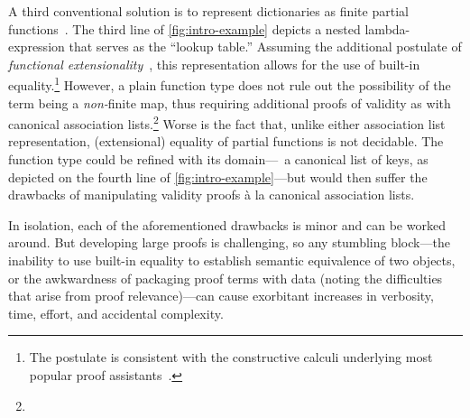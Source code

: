 A third conventional solution is to represent dictionaries as finite partial functions~\citep{XXX,XXX,XXX}.
%
The third line of \autoref{fig:intro-example} depicts a nested lambda-expression that serves as the ``lookup table.'' 
%
Assuming the additional postulate of \emph{functional extensionality}~\cite{XXX}, this representation allows for the use of built-in equality.\footnote{\hspace{0.01in}%
%
The postulate is consistent with the constructive calculi underlying most popular proof assistants~\citep{XXX}.
%
}
%
However, a plain function type does not rule out the possibility of the term being a \emph{non-}finite map, thus requiring additional proofs of validity as with canonical association lists.\footnote{\hspace{0.01in}%
%
%
}
%
Worse is the fact that, unlike either association list representation, (extensional) equality of partial functions is not decidable.
%
The function type could be refined with its domain---\ie{}~a canonical list of keys, as depicted on the fourth line of \autoref{fig:intro-example}---but would then suffer the drawbacks of manipulating validity proofs \`{a} la canonical association lists.

In isolation, each of the aforementioned drawbacks is minor and can be worked around.
%
But developing large proofs is challenging, so any stumbling block---the inability to use built-in equality to establish semantic equivalence of two objects, or the awkwardness of packaging proof terms with data (noting the difficulties that arise from proof relevance)---can cause exorbitant increases in verbosity, time, effort, and accidental complexity.



